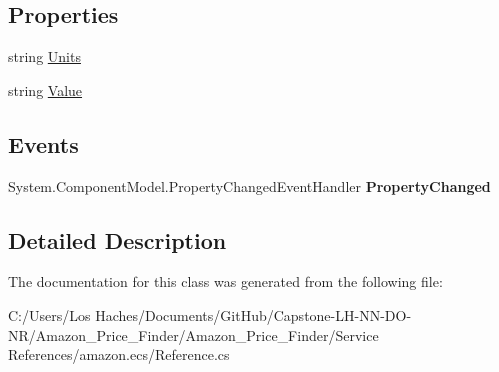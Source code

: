 \subsection*{Properties}
\begin{DoxyCompactItemize}
\item 
\hypertarget{class_amazon___price___finder_1_1amazon_1_1ecs_1_1_non_negative_integer_with_units_ad3c938c9ac88f807e9a5d543f6c1f8d8}{string \hyperlink{class_amazon___price___finder_1_1amazon_1_1ecs_1_1_non_negative_integer_with_units_ad3c938c9ac88f807e9a5d543f6c1f8d8}{Units}}\label{class_amazon___price___finder_1_1amazon_1_1ecs_1_1_non_negative_integer_with_units_ad3c938c9ac88f807e9a5d543f6c1f8d8}

\begin{DoxyCompactList}\small\item\em \end{DoxyCompactList}\item 
\hypertarget{class_amazon___price___finder_1_1amazon_1_1ecs_1_1_non_negative_integer_with_units_ae9c7a15e2ab40ed5ff812422a5d8b4be}{string \hyperlink{class_amazon___price___finder_1_1amazon_1_1ecs_1_1_non_negative_integer_with_units_ae9c7a15e2ab40ed5ff812422a5d8b4be}{Value}}\label{class_amazon___price___finder_1_1amazon_1_1ecs_1_1_non_negative_integer_with_units_ae9c7a15e2ab40ed5ff812422a5d8b4be}

\begin{DoxyCompactList}\small\item\em \end{DoxyCompactList}\end{DoxyCompactItemize}
\subsection*{Events}
\begin{DoxyCompactItemize}
\item 
\hypertarget{class_amazon___price___finder_1_1amazon_1_1ecs_1_1_non_negative_integer_with_units_ae1f49c3654cdd6130cde0b9c14b64c2b}{System.\-Component\-Model.\-Property\-Changed\-Event\-Handler {\bfseries Property\-Changed}}\label{class_amazon___price___finder_1_1amazon_1_1ecs_1_1_non_negative_integer_with_units_ae1f49c3654cdd6130cde0b9c14b64c2b}

\end{DoxyCompactItemize}


\subsection{Detailed Description}


The documentation for this class was generated from the following file\-:\begin{DoxyCompactItemize}
\item 
C\-:/\-Users/\-Los Haches/\-Documents/\-Git\-Hub/\-Capstone-\/\-L\-H-\/\-N\-N-\/\-D\-O-\/\-N\-R/\-Amazon\-\_\-\-Price\-\_\-\-Finder/\-Amazon\-\_\-\-Price\-\_\-\-Finder/\-Service References/amazon.\-ecs/Reference.\-cs\end{DoxyCompactItemize}
